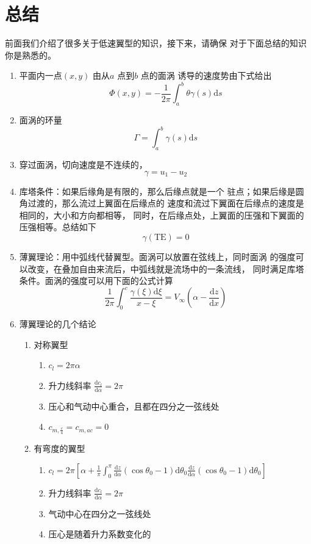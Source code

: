 \section{总结}
前面我们介绍了很多关于低速翼型的知识，接下来，请确保
对于下面总结的知识你是熟悉的。
\begin{summary}
  \begin{enumerate}
    \item 平面内一点$(x,y)$ 由从$a$ 点到$b$ 点的面涡
      诱导的速度势由下式给出
      \[
        \Phi(x,y)=- \frac{1}{2\pi}\int _a^b \theta \gamma(s)\mathrm{d}s
      \]
    \item 面涡的环量
      \[
        \Gamma=\int _a^b \gamma(s)\mathrm{d}s 
      \]
    \item 穿过面涡，切向速度是不连续的，
      \[
        \gamma=u_1 -u_2 
      \] 
    \item 库塔条件：如果后缘角是有限的，那么后缘点就是一个
      驻点；如果后缘是圆角过渡的，那么流过上翼面在后缘点的
      速度和流过下翼面在后缘点的速度是相同的，大小和方向都相等，
      同时，在后缘点处，上翼面的压强和下翼面的压强相等。总结如下
      \[
        \gamma(\mathrm{TE})=0 
      \]
    \item 薄翼理论：用中弧线代替翼型。面涡可以放置在弦线上，同时面涡
      的强度可以改变，在叠加自由来流后，中弧线就是流场中的一条流线，
      同时满足库塔条件。面涡的强度可以用下面的公式计算
      \[
        \frac{1}{2\pi}\int _0^c \frac{\gamma(\xi)\mathrm{d}\xi}{x-\xi}
        =V_\infty \left(\alpha-\frac{\mathrm{d}z}{\mathrm{d}x }\right) 
      \]
    \item 薄翼理论的几个结论
      \begin{enumerate}
        \item 对称翼型
          \begin{enumerate}
            \item $c_l=2\pi \alpha$
            \item 升力线斜率 $\frac{\mathrm{d}c_l}{\mathrm{d}\alpha}=2\pi$
            \item 压心和气动中心重合，且都在四分之一弦线处
            \item $c_{m,\frac{c}{4 }}=c_{m,ac}=0$
          \end{enumerate}
        \item 有弯度的翼型
          \begin{enumerate}
            \item $c_l=2\pi\left[\alpha+\frac{1}{\pi}\int_0^\pi
              \frac{\mathrm{d}z}{\mathrm{d}\alpha}(\cos \theta_0-1)\mathrm{d}\theta_0 \frac{\mathrm{d}z}{\mathrm{d}\alpha}(\cos \theta_0-1)\mathrm{d}\theta_0\right] $
            \item 升力线斜率 $\frac{\mathrm{d}c_l}{\mathrm{d}\alpha}=2\pi$
            \item 气动中心在四分之一弦线处
            \item 压心是随着升力系数变化的
          \end{enumerate}
      \end{enumerate}
  \end{enumerate}
\end{summary}

